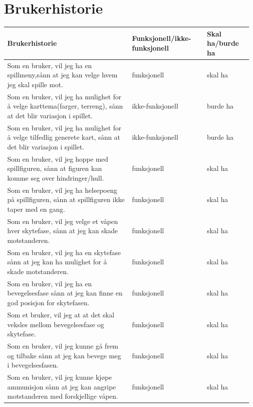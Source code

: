 \documentclass[norsk,a4paper]{article}
\begin{document}
\newpage





\section{Brukerhistorie}


\begin{center}
    \begin{tabular}{ | p{5.5cm} | l | l |}
    \hline
   \textbf{\large Brukerhistorie} & \textbf{\large Funksjonell/ikke-funksjonell} & \textbf{\large Skal ha/burde ha}\\ \hline
   Som en bruker, vil jeg ha en spillmeny,sånn at jeg kan velge hvem jeg skal spille mot. & funksjonell & skal ha   
    \\ \hline
    Som en bruker, vil jeg ha mulighet for å velge karttema(farger, terreng), sånn at det blir variasjon i spillet. & ikke-funksjonell & burde ha 
     \\ \hline
    Som en bruker, vil jeg ha mulighet for å velge tilfedlig generete kart, sånn at det blir variasjon i spillet. & ikke-funksjonell & burde ha
    \\ \hline
    Som en bruker, vil jeg hoppe med spillfiguren, sånn at figuren kan komme seg over hindringer/hull. & funksjonell & skal ha
    \\ \hline
    Som en bruker, vil jeg ha helsepoeng på spillfiguren, sånn at spillfiguren ikke taper med en gang. & funksjonell & skal ha
    \\ \hline 
    Som en bruker, vil jeg velge et våpen hver skytefase, sånn at jeg kan skade motstanderen. & funksjonell & skal ha
  \\ \hline
  Som en bruker, vil jeg ha en skytefase sånn at jeg kan ha mulighet for å skade motstanderen. & funksjonell & skal ha
  \\ \hline
  Som en bruker, vil jeg ha en bevegelsesfase sånn at jeg kan finne en god posisjon for skytefasen. & funksjonell & skal ha
  \\ \hline
  Som et bruker, vil jeg at at det skal veksles mellom bevegelsesfase og skytefase. & funksjonell & skal ha
  \\ \hline
  Som en bruker, vil jeg kunne gå frem og tilbake sånn at jeg kan bevege meg i bevegelsesfasen. & funksjonell & skal ha
  \\ \hline
 Som en bruker, vil jeg kunne kjøpe ammunisjon sånn at jeg kan angripe motstanderen med forskjellige våpen. & funksjonell & skal ha
 \\ \hline

\end{tabular}
\end{center}
\end{document}
